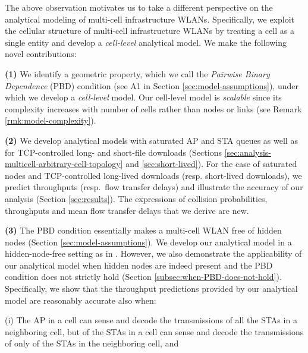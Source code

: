 \documentclass[10pt,a4paper,journal]{IEEEtran}
\theoremstyle{definition}
\theoremstyle{remark}
\theoremstyle{plain}
\begin{document}
The above observation motivates us to take a different perspective on the analytical modeling of multi-cell infrastructure WLANs. Specifically, we exploit the cellular structure of multi-cell infrastructure WLANs by treating a cell as a single entity and develop a \textit{cell-level} analytical model. We make the following novel contributions: 

\vspace{1mm}

\noindent \textbf{(1)} We identify a geometric property, which we call the \textit{Pairwise Binary Dependence} (PBD) condition (see A1 in Section \ref{sec:model-assumptions}), under which we develop a \textit{cell-level} model. Our cell-level model is \textit{scalable} since its complexity increases with number of cells rather than nodes or links (see Remark \ref{rmk:model-complexity}). 

\vspace{1mm}

\noindent \textbf{(2)} We develop analytical models with saturated AP and STA queues as well as for TCP-controlled long- and short-file downloads (Sections \ref{sec:analysis-multicell-arbitrary-cell-topology} and \ref{sec:short-lived}). For the case of saturated nodes and TCP-controlled long-lived downloads (resp. short-lived downloads), we predict throughputs (resp.~flow transfer delays) and illustrate the accuracy of our analysis (Section \ref{sec:results}). The expressions of collision probabilities, throughputs and mean flow transfer delays that we derive are new. 

\vspace{1mm}

\noindent \textbf{(3)} The PBD condition essentially makes a multi-cell WLAN free of hidden nodes (Section \ref{sec:model-assumptions}). We develop our analytical model in a hidden-node-free setting as in \cite{wanet.durvy09selfOrganization,wanet.bonald08multicellprocsharing,wanet.jiang-liew08MobComp-HNEN,wanet.liew_etal09mobicom-capacity-wireless-networks,wanet.liew_etal09ICCback-of-the-envelope}. However, we also demonstrate the applicability of our analytical model when hidden nodes are indeed present and the PBD condition does not strictly hold (Section \ref{subsec:when-PBD-does-not-hold}). Specifically, we show that the throughput predictions provided by our analytical model are reasonably accurate also when: 

\vspace{1mm}

\noindent (i) The AP in a cell can sense and decode the transmissions of all the STAs in a neighboring cell, but  of the STAs in a cell can sense and decode the transmissions of only  of the STAs in the neighboring cell, and 
\end{document}
